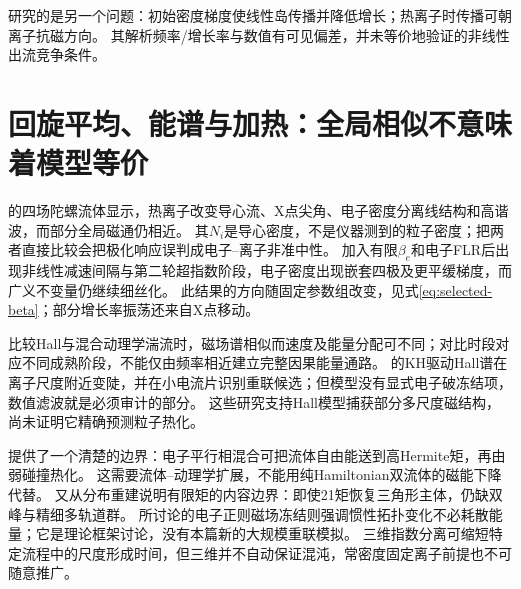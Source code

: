 \citet{E472}研究的是另一个问题：初始密度梯度使线性岛传播并降低增长；热离子时传播可朝离子抗磁方向。
其解析频率/增长率与数值有可见偏差，并未等价地验证\citet{L174}的非线性出流竞争条件。

\section{回旋平均、能谱与加热：全局相似不意味着模型等价}
\citet{E471}的四场陀螺流体显示，热离子改变导心流、X点尖角、电子密度分离线结构和高谐波，而部分全局磁通仍相近。
其$N_i$是导心密度，不是仪器测到的粒子密度；把两者直接比较会把极化响应误判成电子--离子非准中性。
\citet{E474}加入有限$\beta_e$和电子FLR后出现非线性减速间隔与第二轮超指数阶段，电子密度出现嵌套四极及更平缓梯度，而广义不变量仍继续细丝化。
此结果的方向随固定参数组改变，见式\eqref{eq:selected-beta}；部分增长率振荡还来自X点移动。

\citet{L264}比较Hall与混合动理学湍流时，磁场谱相似而速度及能量分配可不同；对比时段对应不同成熟阶段，不能仅由频率相近建立完整因果能量通路。
\citet{F644}的KH驱动Hall谱在离子尺度附近变陡，并在小电流片识别重联候选；但模型没有显式电子破冻结项，数值滤波就是必须审计的部分。
这些研究支持Hall模型捕获部分多尺度磁结构，尚未证明它精确预测粒子热化。

\citet{E512}提供了一个清楚的边界：电子平行相混合可把流体自由能送到高Hermite矩，再由弱碰撞热化。
这需要流体--动理学扩展，不能用纯Hamiltonian双流体的磁能下降代替。
\citet{E553}又从分布重建说明有限矩的内容边界：即使21矩恢复三角形主体，仍缺双峰与精细多轨道群。
\citet{L313}所讨论的电子正则磁场冻结则强调惯性拓扑变化不必耗散能量；它是理论框架讨论，没有本篇新的大规模重联模拟。
三维指数分离可缩短特定流程中的尺度形成时间，但三维并不自动保证混沌，常密度固定离子前提也不可随意推广。
